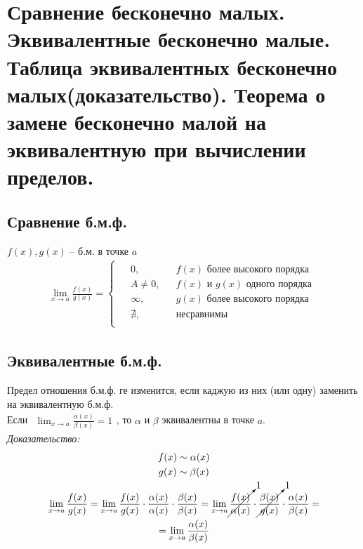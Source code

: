 \documentclass[12pt, fleqn]{article}
\begin{document}
\section{Сравнение бесконечно малых. Эквивалентные бесконечно малые. Таблица эквивалентных бесконечно малых(доказательство). Теорема о замене бесконечно малой на эквивалентную при вычислении пределов.}
\subsection{Сравнение б.м.ф.}
$f(x), g(x)$ -- б.м. в точке $a$
\begin{align*}
	\lim_{x\to a}\frac{f(x)}{g(x)} = \begin{cases}
		\begin{aligned}
		&0,&& f(x)\text{ более высокого порядка}\\
		&A\neq0,&&f(x) \text{ и } g(x) \text{ одного порядка}\\
		&\infty,&&g(x) \text{ более высокого порядка}\\
		&\nexists,&& \text{несравнимы}\\
		\end{aligned}
	\end{cases}
\end{align*}
\subsection{Эквивалентные б.м.ф.}
Предел отношения б.м.ф. ге изменится, если каджую из них (или одну) заменить на эквивалентную б.м.ф.\\
Если $\begin{gathered}
	\lim_{x \to a}\frac{\alpha(x)}{\beta(x)}=1
\end{gathered}$, то $\alpha$ и $\beta$ эквивалентны в точке $a$.\\
\textit{Доказательство:}
\begin{multline*}
	f(x) \sim \alpha(x)\\
	g(x) \sim \beta(x)\\
	\lim_{x\to a}\frac{f(x)}{g(x)}=\lim_{x\to a} \frac{f(x)}{g(x)}\cdot\frac{\alpha(x)}{\alpha(x)}\cdot \frac{\beta(x)}{\beta(x)}=\lim_{x\to a}\cancelto{1}{\frac{f(x)}{\alpha(x)}}\cdot\cancelto{1}{\frac{\beta(x)}{g(x)}}\cdot\frac{\alpha(x)}{\beta(x)}=\\
	=\lim_{x\to a}\frac{\alpha(x)}{\beta(x)}\\
\end{multline*}
\end{document}
